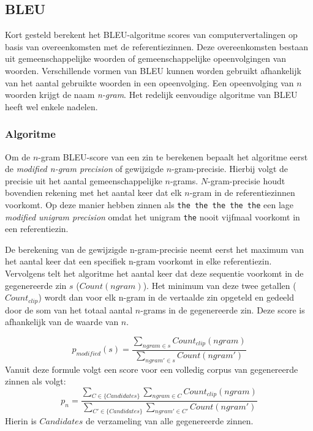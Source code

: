 \subsection{BLEU}
Kort gesteld berekent het BLEU-algoritme scores van computervertalingen op basis van overeenkomsten met de referentiezinnen. Deze overeenkomsten bestaan uit gemeenschappelijke woorden of gemeenschappelijke opeenvolgingen van woorden. Verschillende vormen van BLEU kunnen worden gebruikt afhankelijk van het aantal gebruikte woorden in een opeenvolging. Een opeenvolging van $n$ woorden krijgt de naam \emph{n-gram}. Het redelijk eenvoudige algoritme van BLEU heeft wel enkele nadelen.

\subsubsection{Algoritme}
Om de $n$-gram BLEU-score van een zin te berekenen bepaalt het algoritme eerst de \textit{modified n-gram precision} of gewijzigde $n$-gram-precisie. Hierbij volgt de precisie uit het aantal gemeenschappelijke $n$-grams. $N$-gram-precisie houdt bovendien rekening met het aantal keer dat elk $n$-gram in de referentiezinnen voorkomt. Op deze manier hebben zinnen als \texttt{the the the the the} een lage \emph{modified unigram precision} omdat het unigram \texttt{the} nooit vijfmaal voorkomt in een referentiezin. 

De berekening van de gewijzigde n-gram-precisie neemt eerst het maximum van het aantal keer dat een specifiek n-gram voorkomt in elke referentiezin. Vervolgens telt het algoritme het aantal keer dat deze sequentie voorkomt in de gegenereerde zin $s$ ($Count(ngram)$). Het minimum van deze twee getallen ($Count_ {clip}$) wordt dan voor elk n-gram in de vertaalde zin opgeteld en gedeeld door de som van het totaal aantal $n$-grams in de gegenereerde zin. Deze score is afhankelijk van de waarde van $n$.

\begin{equation}
p_{modified}(s) =
\frac{\sum\limits_{ngram \in s} Count_{clip}(ngram)}{\sum\limits_{ngram' \in s} Count(ngram')}
\label{formule:ngramprecision}
\end{equation}
Vanuit deze formule volgt een score voor een volledig corpus van gegenereerde zinnen als volgt:
\begin{equation}
p_{n} =
\frac{\sum\limits_{C \in \{Candidates\} } \sum\limits_{ngram \in C} Count_{clip}(ngram)}{\sum\limits_{C' \in \{Candidates\} } \sum\limits_{ngram' \in C'} Count(ngram')}
\label{formule:corpus_modified}
\end{equation}
Hierin is $Candidates$ de verzameling van alle gegenereerde zinnen.

